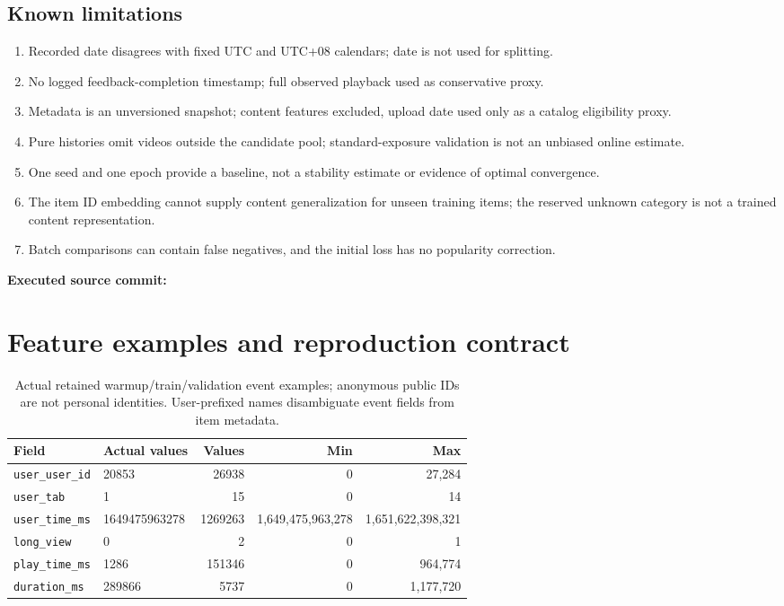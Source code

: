\documentclass[11pt,a4paper]{article}
\begin{document}
\subsection{Known limitations}
\begin{enumerate}
\item Recorded date disagrees with fixed UTC and UTC+08 calendars; date is not used for splitting.
\item No logged feedback-completion timestamp; full observed playback used as conservative proxy.
\item Metadata is an unversioned snapshot; content features excluded, upload date used only as a catalog eligibility proxy.
\item Pure histories omit videos outside the candidate pool; standard-exposure validation is not an unbiased online estimate.
\item One seed and one epoch provide a baseline, not a stability estimate or evidence of optimal convergence.
\item The item ID embedding cannot supply content generalization for unseen training items; the reserved unknown category is not a trained content representation.
\item Batch comparisons can contain false negatives, and the initial loss has no popularity correction.
\end{enumerate}
\clearpage
\textbf{Executed source commit:} 

\appendix\section{Feature examples and reproduction contract}
\begin{table}[H]\centering\small\begin{tabularx}{\linewidth}{lXrrr}\toprule
Field & Actual values & Values & Min & Max\\\midrule
\texttt{user\_user\_id} & 20853 & 26938 & 0 & 27,284 \\
\texttt{user\_tab} & 1 & 15 & 0 & 14 \\
\texttt{user\_time\_ms} & 1649475963278 & 1269263 & 1,649,475,963,278 & 1,651,622,398,321 \\
\texttt{long\_view} & 0 & 2 & 0 & 1 \\
\texttt{play\_time\_ms} & 1286 & 151346 & 0 & 964,774 \\
\texttt{duration\_ms} & 289866 & 5737 & 0 & 1,177,720 \\\bottomrule\end{tabularx}\caption{Actual retained warmup/train/validation event examples; anonymous public IDs are not personal identities. User-prefixed names disambiguate event fields from item metadata.}\end{table}
\end{document}
